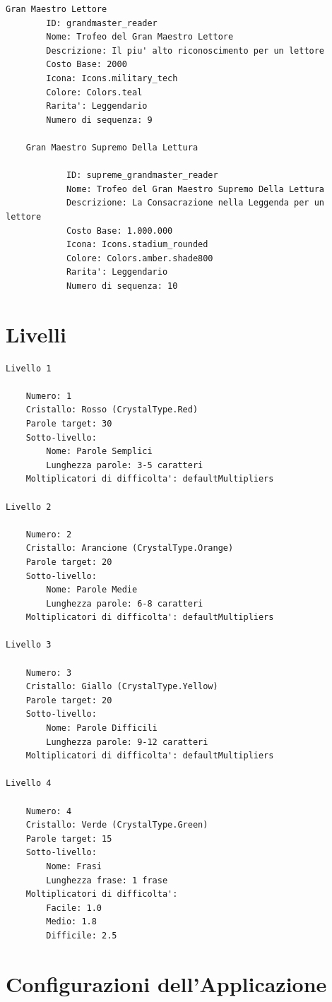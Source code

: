 \documentclass[14pt]{extbook}
\begin{document}
\begin{lstlisting}[caption=Elenco Trofei, label=lst:Trofei]
    Gran Maestro Lettore
        ID: grandmaster_reader
        Nome: Trofeo del Gran Maestro Lettore
        Descrizione: Il piu' alto riconoscimento per un lettore
        Costo Base: 2000
        Icona: Icons.military_tech
        Colore: Colors.teal
        Rarita': Leggendario
        Numero di sequenza: 9

    Gran Maestro Supremo Della Lettura

    		ID: supreme_grandmaster_reader
    		Nome: Trofeo del Gran Maestro Supremo Della Lettura
    		Descrizione: La Consacrazione nella Leggenda per un lettore
    		Costo Base: 1.000.000
    		Icona: Icons.stadium_rounded
    		Colore: Colors.amber.shade800
    		Rarita': Leggendario
    		Numero di sequenza: 10
\end{lstlisting}
\pagebreak

\section{Livelli}
\begin{lstlisting}[caption=Elenco Livelli, label=lst:Livelli]
Livello 1

    Numero: 1
    Cristallo: Rosso (CrystalType.Red)
    Parole target: 30
    Sotto-livello:
        Nome: Parole Semplici
        Lunghezza parole: 3-5 caratteri
    Moltiplicatori di difficolta': defaultMultipliers

Livello 2

    Numero: 2
    Cristallo: Arancione (CrystalType.Orange)
    Parole target: 20
    Sotto-livello:
        Nome: Parole Medie
        Lunghezza parole: 6-8 caratteri
    Moltiplicatori di difficolta': defaultMultipliers

Livello 3

    Numero: 3
    Cristallo: Giallo (CrystalType.Yellow)
    Parole target: 20
    Sotto-livello:
        Nome: Parole Difficili
        Lunghezza parole: 9-12 caratteri
    Moltiplicatori di difficolta': defaultMultipliers

Livello 4

    Numero: 4
    Cristallo: Verde (CrystalType.Green)
    Parole target: 15
    Sotto-livello:
        Nome: Frasi
        Lunghezza frase: 1 frase
    Moltiplicatori di difficolta':
        Facile: 1.0
        Medio: 1.8
        Difficile: 2.5
\end{lstlisting}
\pagebreak

\section{Configurazioni dell'Applicazione}
\end{document}
